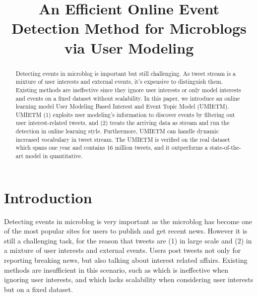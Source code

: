 \documentclass{llncs}
\title{An Efficient Online Event Detection Method for Microblogs via User Modeling}
\begin{document}
\maketitle
\begin{abstract}
Detecting events in microblog is important but still challenging. As tweet stream is a mixture of user interests and external events, it’s expensive to distinguish them.
Existing methods are ineffective since they ignore user interests or only model interests and events on a fixed dataset without scalability. In this paper, we introduce an online learning model User Modeling Based Interest and Event Topic Model (UMIETM). UMIETM (1) exploits user modeling's information to discover events by filtering out user interest-related tweets, and (2) treats the arriving data as stream and run the detection in online learning style. Furthermore, UMIETM can handle dynamic increased vocabulary in tweet stream. The UMIETM is verified on the real dataset which spans one year and contains 16 million tweets, and it outperforms a state-of-the-art model in quantitative.
\end{abstract}
\section{Introduction}
Detecting events in microblog is very important as the microblog has become one of the most popular sites for users to publish and get recent news.
However it is still a challenging task, for the reason that tweets are (1) in large scale and (2) in a mixture of user interests and external events.
Users post tweets not only for reporting breaking news, but also talking about interest related affairs.
Existing methods are insufficient in this scenario, such as \cite{lau2012line} which is ineffective when ignoring user interests, and \cite{timeUserLDA2012finding} which lacks scalability when considering user interests but on a fixed dataset.
\end{document}

